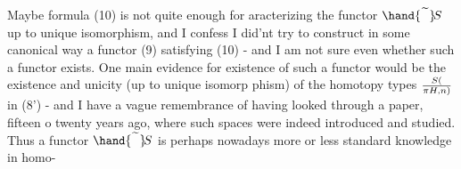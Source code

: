 Maybe formula (10) is not quite enough for aracterizing the functor
$\hand{\widetilde{\phantom{S}}}\!S$ up to unique isomorphism, and I confess I did'nt try to construct
in some canonical way a functor (9) satisfying (10) - and I am not  sure
even whether such a functor exists. One main evidence for existence of
such a functor would be the existence and unicity (up to unique isomorp
phism) of the homotopy types $S(\over{\pi}{H},n)$ in (8') - and I have a vague
remembrance of having looked through a paper, fifteen o twenty years
ago, where such spaces were indeed introduced and studied.  Thus
a functor $\hand{\widetilde{\phantom{S}}}\!S$ is perhaps nowadays more or less standard knowledge in homo-%

